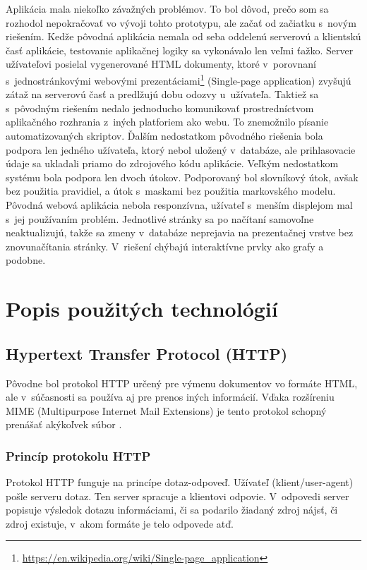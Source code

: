 \documentclass[slovak]{fitthesis}
\begin{document}
\noindent
Aplikácia mala niekoľko závažných problémov. To bol dôvod, prečo som sa rozhodol nepokračovať vo vývoji tohto prototypu, ale začať od začiatku s~novým riešením. Kedže pôvodná aplikácia nemala od seba oddelenú serverovú a klientskú časť aplikácie, testovanie aplikačnej logiky sa vykonávalo len veľmi ťažko. Server užívateľovi posielal vygenerované HTML dokumenty, ktoré v~porovnaní s~jednostránkovými webovými prezentáciami\footnote{\url{https://en.wikipedia.org/wiki/Single-page_application}} (Single-page application) zvyšujú zátaž na serverovú časť a predlžujú dobu odozvy u~užívateľa. Taktiež sa s~pôvodným riešením nedalo jednoducho komunikovať prostredníctvom aplikačného rozhrania z~iných platforiem ako webu. To znemožnilo písanie automatizovaných skriptov. Ďalším nedostatkom pôvodného riešenia bola podpora len jedného užívateľa, ktorý nebol uložený v~databáze, ale prihlasovacie údaje sa ukladali priamo do zdrojového kódu aplikácie. Veľkým nedostatkom systému bola podpora len dvoch útokov. Podporovaný bol slovníkový útok, avšak bez použitia pravidiel, a útok s~maskami bez použitia markovského modelu. Pôvodná webová aplikácia nebola responzívna, užívateľ s~menším displejom mal s~jej používaním problém. Jednotlivé stránky sa po načítaní samovoľne neaktualizujú, takže sa zmeny v~databáze neprejavia na prezentačnej vrstve bez znovunačítania stránky. V~riešení chýbajú interaktívne prvky ako grafy a podobne.


\chapter{Popis použitých technológií}\label{technologie}


\section{Hypertext Transfer Protocol (HTTP)}\label{http}
Pôvodne bol protokol HTTP určený pre výmenu dokumentov vo formáte HTML, ale v~súčasnosti sa používa aj pre prenos iných informácií. Vďaka rozšíreniu MIME (Multipurpose Internet Mail Extensions) je tento protokol schopný prenášať akýkoľvek súbor \cite{httpRFC}.

\subsection{Princíp protokolu HTTP}
Protokol HTTP funguje na princípe dotaz-odpoveď. Užívateľ (klient/user-agent) pošle serveru dotaz. Ten server spracuje a klientovi odpovie. V~odpovedi server popisuje výsledok dotazu informáciami, či sa podarilo žiadaný zdroj nájsť, či zdroj existuje, v~akom formáte je telo odpovede atď.
\end{document}
